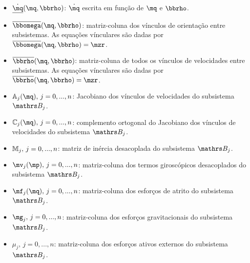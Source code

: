 \documentclass[a4paper,11pt,brazil,fleqn]{article}
\begin{document}
\begin{itemize}
\item $\underline{\dot{\mq}}(\mq,\mrho)$: $\dot{\mq}$ escrita em fun\c{c}\~ao de $\mq$ e $\mrho$.
\item $\overline{\momega}(\mq,\mrho)$: matriz-coluna dos v\'inculos de orienta\c{c}\~ao entre subsistemas. As equa\c{c}\~oes v\'inculares s\~ao dadas por $\overline{\momega}(\mq,\mrho) = \mzr $.
\item $\overline{\mrho}(\mq,\mrho)$: matriz-coluna de todos os v\'inculos de velocidades entre subsistemas. As equa\c{c}\~oes v\'inculares s\~ao dadas por $\overline{\mrho}(\mq,\mrho) = \mzr $.
\item $\mA_j(\mq), \,j=0, ..., n$: Jacobiano dos v\'inculos de velocidades do subsistema $\ssB_j$.
\item $\mC_j(\mq), \,j=0, ..., n$: complemento ortogonal do Jacobiano dos v\'inculos de velocidades do subsistema $\ssB_j$.
\item $\mathbb{M}_j, \,j=0, ..., n$: matriz de in\'ercia desacoplada do subsistema $\ssB_j$.
\item $\mv_j(\mp), \,j=0, ..., n$: matriz-coluna dos termos girosc\'opicos desacoplados do subsistema $\ssB_j$.
\item $\mf_j(\mq), \,j=0, ..., n$: matriz-coluna dos esfor\c{c}os de atrito do subsistema $\ssB_j$.
\item $\mg_j, \,j=0, ..., n$: matriz-coluna dos esfor\c{c}os gravitacionais do subsistema $\ssB_j$.
\item $\mu_j, \,j=0, ..., n$: matriz-coluna dos esfor\c{c}os ativos externos do subsistema $\ssB_j$.
\end{itemize}
\end{document}
